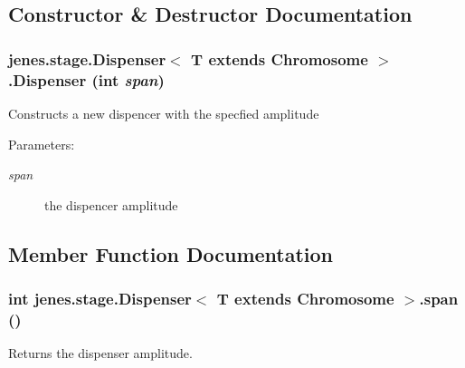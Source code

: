 \subsection{Constructor \& Destructor Documentation}
\hypertarget{classjenes_1_1stage_1_1_dispenser_3_01_t_01extends_01_chromosome_01_4_8972dc3bcea956122cc623784a833bcf}{
\subsubsection[Dispenser]{\setlength{\rightskip}{0pt plus 5cm}jenes.stage.Dispenser$<$ T extends Chromosome $>$.Dispenser (int {\em span})}}
\label{classjenes_1_1stage_1_1_dispenser_3_01_t_01extends_01_chromosome_01_4_8972dc3bcea956122cc623784a833bcf}


Constructs a new dispencer with the specfied amplitude

\begin{Desc}
\item[Parameters:]
\begin{description}
\item[{\em span}]the dispencer amplitude \end{description}
\end{Desc}


\subsection{Member Function Documentation}
\hypertarget{classjenes_1_1stage_1_1_dispenser_3_01_t_01extends_01_chromosome_01_4_6ece937f3d7564424f6367e96e1b21c7}{
\subsubsection[span]{\setlength{\rightskip}{0pt plus 5cm}int jenes.stage.Dispenser$<$ T extends Chromosome $>$.{\bf span} ()}}
\label{classjenes_1_1stage_1_1_dispenser_3_01_t_01extends_01_chromosome_01_4_6ece937f3d7564424f6367e96e1b21c7}


Returns the dispenser amplitude. 

